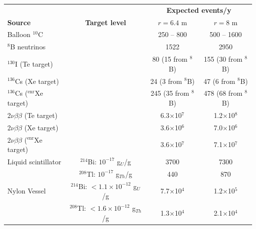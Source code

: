 \begin{table}[t]
\centering
\begin{tabular}{lccc}
\toprule
                                            &                                              & \multicolumn{2}{c}{\bf Expected events/y}     \\
{\bf Source}                                & {\bf Target level}                           & $r = 6.4$ m           & $r = 8$ m             \\
\midrule
Balloon $^{10}$C                            &                                              & 250 -- 800            & 500 -- 1600           \\
$^{8}$B neutrinos                           &                                              & 1522                  & 2950                  \\
$^{130}$I (Te target)                       &                                              & 80 (15 from $^{8}$B)   & 155  (30 from $^{8}$B) \\
$^{136}$Cs (Xe target)                      &                                              & 24 (3 from $^{8}$B)   & 47 (6 from $^{8}$B)   \\
$^{136}$Cs ($^\mathrm{enr}$Xe target)       &                                              & 245 (35 from $^{8}$B) & 478 (68 from $^{8}$B) \\
2$\nu\beta\beta$ (Te target)                &                                              & 6.3$\times$10$^{7}$   & 1.2$\times$10$^{8}$   \\  
2$\nu\beta\beta$ (Xe target)                &                                              & 3.6$\times$10$^{6}$   & 7.0$\times$10$^{6}$   \\  
2$\nu\beta\beta$ ($^\mathrm{enr}$Xe target) &                                              & 3.6$\times$10$^{7}$   &  7.1$\times$10$^{7}$  \\  
Liquid scintillator                         & $^{214}$Bi: $10^{-17}$ g$_{U}$/g             & 3700                  & 7300                  \\
                                            & $^{208}$Tl: $10^{-17}$ g$_{Th}$/g            & 440                   & 870                   \\
Nylon Vessel                                & $^{214}$Bi: $<1.1\times10^{-12}$ g$_{U}$/g   & 7.7$\times$10$^{4}$   & 1.2$\times$10$^{5}$   \\
                                            & $^{208}$Tl: $<1.6\times10^{-12}$ g$_{Th}$/g  & 1.3$\times$10$^{4}$   & 2.1$\times$10$^{4}$   \\

\end{tabular}
\end{table}
